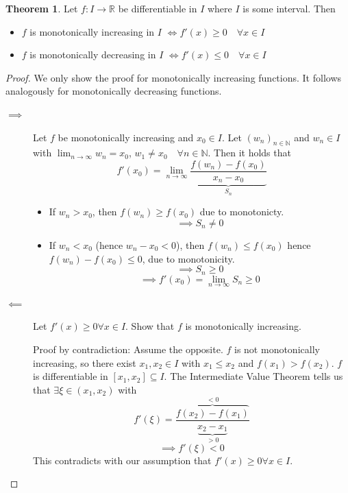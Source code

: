 \documentclass[a4paper,landscape,twocolumn]{article}
\theoremstyle{definition}
\newtheorem{theorem}{Theorem}
\begin{document}
%
\begin{theorem}
  Let $f: I \to \mathbb R$ be differentiable in $I$ where $I$ is some interval.
  Then
  \begin{itemize}
    \item $f$ is monotonically increasing in $I$ $\iff f'(x) \geq 0 \quad \forall x \in I$
    \item $f$ is monotonically decreasing in $I$ $\iff f'(x) \leq 0 \quad \forall x \in I$
  \end{itemize}
\end{theorem}
\begin{proof}
  We only show the proof for monotonically increasing functions.
  It follows analogously for monotonically decreasing functions.

  \begin{description}
    \item[$\implies$]
      Let $f$ be monotonically increasing and $x_0 \in I$. Let $(w_n)_{n\in\mathbb N}$
      and $w_n \in I$ with $\lim_{n\to\infty} w_n = x_0$, $w_1 \neq x_0 \quad \forall n \in \mathbb N$.
      Then it holds that
      \[ f'(x_0) = \lim_{n\to\infty} \underbrace{\frac{f(w_n) - f(x_0)}{x_n - x_0}}_{S_n} \]
      \begin{itemize}
        \item If $w_n > x_0$, then $f(w_n) \geq f(x_0)$ due to monotonicty.
          \[ \implies S_n \neq 0 \]
        \item If $w_n < x_0$ (hence $w_n - x_0 < 0$), then $f(w_n) \leq f(x_0)$ hence $f(w_n) - f(x_0) \leq 0$,
          due to monotonicity.
          \[ \implies S_n \geq 0 \]
          \[ \implies f'(x_0) = \lim_{n\to\infty} S_n \geq 0 \]
      \end{itemize}
    \item[$\impliedby$]
      Let $f'(x) \geq 0 \forall x \in I$. Show that $f$ is monotonically increasing.

      Proof by contradiction: Assume the opposite. $f$ is not monotonically increasing,
      so there exist $x_1, x_2 \in I$ with $x_1 \leq x_2$ and $f(x_1) > f(x_2)$.
      $f$ is differentiable in $[x_1, x_2] \subseteq I$. The Intermediate Value Theorem
      tells us that $\exists \xi \in (x_1, x_2)$ with
      \[ f'(\xi) = \frac{\overbrace{f(x_2) - f(x_1)}^{<0}}{\underbrace{x_2 - x_1}_{>0}} \]
      \[ \implies f'(\xi) < 0 \]
      This contradicts with our assumption that $f'(x) \geq 0 \forall x \in I$.
  \end{description}
\end{proof}
\end{document}
